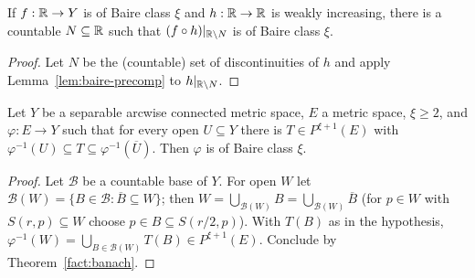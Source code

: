 \begin{lemma}\label{lem:monotone-compose}
If $f:\mathbb{R}\to Y$ is of Baire class $\xi$ and $h:\mathbb{R}\to\mathbb{R}$ is weakly increasing, there is a countable
$N\subseteq\mathbb{R}$ such that $(f\circ h)|_{\mathbb{R}\setminus N}$ is of Baire class $\xi$.
\end{lemma}
\begin{proof}
Let $N$ be the (countable) set of discontinuities of $h$ and apply Lemma~\ref{lem:baire-precomp} to
$h|_{\mathbb{R}\setminus N}$.
\end{proof}

\begin{lemma}\label{lem:baire-criterion}
Let $Y$ be a separable arcwise connected metric space, $E$ a metric space, $\xi\ge2$, and
$\varphi:E\to Y$ such that for every open $U\subseteq Y$ there is $T\in P^{\xi+1}(E)$ with
$\varphi^{-1}(U)\subseteq T\subseteq\varphi^{-1}(\overline U)$. Then $\varphi$ is of Baire class $\xi$.
\end{lemma}
\begin{proof}
Let $\mathcal B$ be a countable base of $Y$. For open $W$ let $\mathcal B(W)=\{B\in\mathcal
B:\overline B\subseteq W\}$; then $W=\bigcup_{\mathcal B(W)}B=\bigcup_{\mathcal B(W)}\overline B$ (for
$p\in W$ with $S(r,p)\subseteq W$ choose $p\in B\subseteq S(r/2,p)$). With $T(B)$ as in the hypothesis,
$\varphi^{-1}(W)=\bigcup_{B\in\mathcal B(W)}T(B)\in P^{\xi+1}(E)$. Conclude by Theorem~\ref{fact:banach}.
\end{proof}
